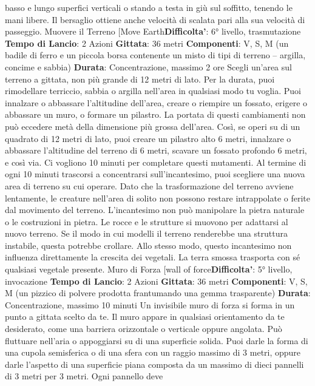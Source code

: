 \begin{multicols}{2}
basso e lungo superfici verticali o stando a testa in giù
sul soffitto, tenendo le mani libere. Il bersaglio ottiene
anche velocità di scalata pari alla sua velocità di
passeggio.
Muovere il Terreno
[Move Earth\textbf{Difficolta'}:
6° livello, trasmutazione
\textbf{Tempo di Lancio}: 2 Azioni
\textbf{Gittata}: 36 metri
\textbf{Componenti}: V, S, M (un badile di ferro e un piccola
borsa contenente un misto di tipi di terreno – argilla,
concime e sabbia)
\textbf{Durata}: Concentrazione, massimo 2 ore
Scegli un’area sul terreno a gittata, non più grande di
12 metri di lato. Per la durata, puoi rimodellare terriccio,
sabbia o argilla nell’area in qualsiasi modo tu voglia.
Puoi innalzare o abbassare l’altitudine dell’area, creare
o riempire un fossato, erigere o abbassare un muro, o
formare un pilastro. La portata di questi cambiamenti
non può eccedere metà della dimensione più grossa
dell’area. Così, se operi su di un quadrato di 12 metri di
lato, puoi creare un pilastro alto 6 metri, innalzare o
abbassare l’altitudine del terreno di 6 metri, scavare un
fossato profondo 6 metri, e così via. Ci vogliono 10
minuti per completare questi mutamenti.
Al termine di ogni 10 minuti trascorsi a concentrarsi
sull’incantesimo, puoi scegliere una nuova area di
terreno su cui operare.
Dato che la trasformazione del terreno avviene
lentamente, le creature nell’area di solito non possono
restare intrappolate o ferite dal movimento del terreno.
L’incantesimo non può manipolare la pietra naturale o
le costruzioni in pietra. Le rocce e le strutture si
muovono per adattarsi al nuovo terreno. Se il modo in
cui modelli il terreno renderebbe una struttura instabile,
questa potrebbe crollare.
Allo stesso modo, questo incantesimo non influenza
direttamente la crescita dei vegetali. La terra smossa
trasporta con sé qualsiasi vegetale presente.
Muro di Forza
[wall of force\textbf{Difficolta'}:
5° livello, invocazione
\textbf{Tempo di Lancio}: 2 Azioni
\textbf{Gittata}: 36 metri
\textbf{Componenti}: V, S, M (un pizzico di polvere prodotta
frantumando una gemma trasparente)
\textbf{Durata}: Concentrazione, massimo 10 minuti
Un invisibile muro di forza si forma in un punto a gittata
scelto da te. Il muro appare in qualsiasi orientamento
da te desiderato, come una barriera orizzontale o
verticale oppure angolata. Può fluttuare nell’aria o
appoggiarsi su di una superficie solida. Puoi darle la
forma di una cupola semisferica o di una sfera con un
raggio massimo di 3 metri, oppure darle l’aspetto di una
superficie piana composta da un massimo di dieci
pannelli di 3 metri per 3 metri. Ogni pannello deve

\end{multicols}
